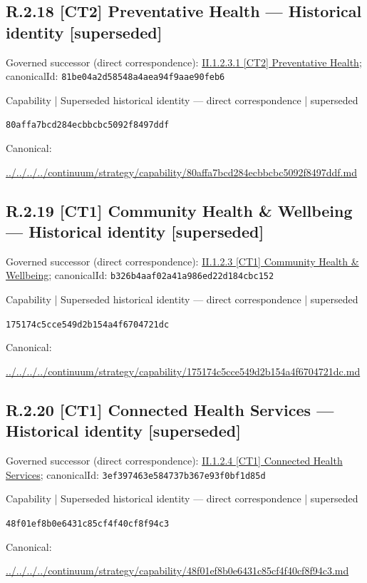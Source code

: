 \documentclass[10pt,a4paper]{article}
\begin{document}
\subsection*{R.2.18 [CT2] Preventative Health — Historical identity [superseded]}
Governed successor (direct correspondence): \hyperref[element-81be04a2d58548a4aea94f9aae90feb6]{II.1.2.3.1 [CT2] Preventative Health}; canonicalId: \texttt{81be04a2d58548a4aea94f9aae90feb6}\par
\label{element-80affa7bcd284ecbbcbc5092f8497ddf}
{\small Capability | Superseded historical identity — direct correspondence | superseded}\par
\texttt{80affa7bcd284ecbbcbc5092f8497ddf}\par
Canonical: \par
{\footnotesize\url{../../../../continuum/strategy/capability/80affa7bcd284ecbbcbc5092f8497ddf.md}}\par
\subsection*{R.2.19 [CT1] Community Health \& Wellbeing — Historical identity [superseded]}
Governed successor (direct correspondence): \hyperref[element-b326b4aaf02a41a986ed22d184cbc152]{II.1.2.3 [CT1] Community Health \& Wellbeing}; canonicalId: \texttt{b326b4aaf02a41a986ed22d184cbc152}\par
\label{element-175174c5cce549d2b154a4f6704721dc}
{\small Capability | Superseded historical identity — direct correspondence | superseded}\par
\texttt{175174c5cce549d2b154a4f6704721dc}\par
Canonical: \par
{\footnotesize\url{../../../../continuum/strategy/capability/175174c5cce549d2b154a4f6704721dc.md}}\par
\subsection*{R.2.20 [CT1] Connected Health Services — Historical identity [superseded]}
Governed successor (direct correspondence): \hyperref[element-3ef397463e584737b367e93f0bf1d85d]{II.1.2.4 [CT1] Connected Health Services}; canonicalId: \texttt{3ef397463e584737b367e93f0bf1d85d}\par
\label{element-48f01ef8b0e6431c85cf4f40cf8f94c3}
{\small Capability | Superseded historical identity — direct correspondence | superseded}\par
\texttt{48f01ef8b0e6431c85cf4f40cf8f94c3}\par
Canonical: \par
{\footnotesize\url{../../../../continuum/strategy/capability/48f01ef8b0e6431c85cf4f40cf8f94c3.md}}\par
\end{document}
